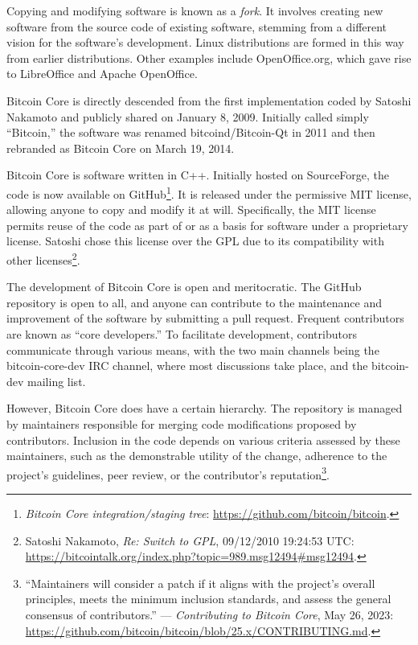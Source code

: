 \documentclass[
  a5paper,
  smalldemyvopaper,10pt,twoside,onecolumn,openright,extrafontsizes,hidelinks]{memoir}
\begin{document}
Copying and modifying software is known as a \emph{fork}. It involves
creating new software from the source code of existing software,
stemming from a different vision for the software's development. Linux
distributions are formed in this way from earlier distributions. Other
examples include OpenOffice.org, which gave rise to LibreOffice and
Apache OpenOffice.

Bitcoin Core is directly descended from the first implementation coded
by Satoshi Nakamoto and publicly shared on January 8, 2009. Initially
called simply ``Bitcoin,'' the software was renamed bitcoind/Bitcoin-Qt
in 2011 and then rebranded as Bitcoin Core on March 19, 2014.

Bitcoin Core is software written in C++. Initially hosted on
SourceForge, the code is now available on GitHub\footnote{\emph{Bitcoin
  Core integration/staging tree}:
  \url{https://github.com/bitcoin/bitcoin}.}. It is released under the
permissive MIT license, allowing anyone to copy and modify it at will.
Specifically, the MIT license permits reuse of the code as part of or as
a basis for software under a proprietary license. Satoshi chose this
license over the GPL due to its compatibility with other
licenses\footnote{Satoshi Nakamoto, \emph{Re: Switch to GPL}, 09/12/2010
  19:24:53 UTC:
  \url{https://bitcointalk.org/index.php?topic=989.msg12494\#msg12494}.}.

The development of Bitcoin Core is open and meritocratic. The GitHub
repository is open to all, and anyone can contribute to the maintenance
and improvement of the software by submitting a pull request. Frequent
contributors are known as ``core developers.'' To facilitate
development, contributors communicate through various means, with the
two main channels being the bitcoin-core-dev IRC channel, where most
discussions take place, and the bitcoin-dev mailing list.

However, Bitcoin Core does have a certain hierarchy. The repository is
managed by maintainers responsible for merging code modifications
proposed by contributors. Inclusion in the code depends on various
criteria assessed by these maintainers, such as the demonstrable utility
of the change, adherence to the project's guidelines, peer review, or
the contributor's reputation\footnote{``Maintainers will consider a
  patch if it aligns with the project's overall principles, meets the
  minimum inclusion standards, and assess the general consensus of
  contributors.'' --- \emph{Contributing to Bitcoin Core}, May 26, 2023:
  \url{https://github.com/bitcoin/bitcoin/blob/25.x/CONTRIBUTING.md}.}.
\end{document}
